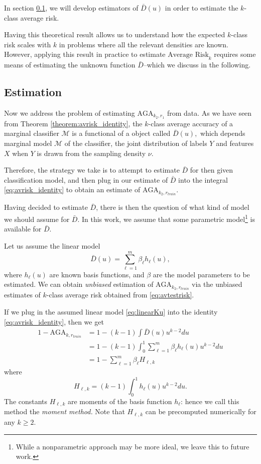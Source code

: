 \documentclass[12pt]{article}
\begin{document}
In section \ref{sec:extrapolation_estimation}, we will develop
estimators of $\bar{D}(u)$ in order to estimate the $k$-class average
risk.

Having this theoretical result allows us to understand how the
expected $k$-class risk scales with $k$ in problems where all the
relevant densities are known.  However, applying this result in
practice to estimate $\text{Average Risk}_k$ requires some means of
estimating the unknown function $\bar{D}$--which we discuss in the
following.

\subsection{Estimation}\label{sec:extrapolation_estimation}

Now we address the problem of estimating $\text{AGA}_{k_2, r_1}$ from
data.  As we have seen from Theorem \ref{theorem:avrisk_identity}, the
$k$-class average accuracy of a marginal classifier $\mathcal{M}$ is a
functional of a object called $\bar{D}(u),$ which depends marginal
model $\mathcal{M}$ of the classifier, the joint distribution of
labels $Y$ and features $X$ when $Y$ is drawn from the sampling
density $\nu$.

Therefore, the strategy we take is to attempt to estimate $\bar{D}$
for then given classification model, and then plug in our estimate of
$\bar{D}$ into the integral \eqref{eq:avrisk_identity} to obtain an
estimate of $\text{AGA}_{k_2, r_{train}}$.

Having decided to estimate $\bar{D}$, there is then the question of
what kind of model we should assume for $\bar{D}$.  In this work, we
assume that some parametric model\footnote{While a
nonparametric approach may be more ideal, we leave this to future work.} is available for $\bar{D}$.

Let us assume the linear model
\begin{equation}\label{eq:linearKu}
\bar{D}(u) = \sum_{\ell = 1}^m \beta_\ell h_\ell(u),
\end{equation}
where $h_\ell(u)$ are known basis functions, and $\beta$ are the model
parameters to be estimated. We can obtain \emph{unbiased} estimation
of $\text{AGA}_{k_2, r_{train}}$ via the unbiased estimates of
$k$-class average risk obtained from \eqref{eq:avtestrisk}.

If we plug in the assumed linear model \eqref{eq:linearKu} into the
identity \eqref{eq:avrisk_identity}, then we get
\begin{align}
1 - \text{AGA}_{k, r_{train}} &= 1 - (k-1)\int \bar{D}(u) u^{k-2} du
\\&= 1 - (k-1)\int_0^1 \sum_{\ell = 1}^m \beta_\ell h_\ell(u) u^{k-2} du
\\&= 1 - \sum_{\ell = 1}^m \beta_\ell H_{\ell,k} \label{eq:avrisk_linear}
\end{align}
where
\begin{equation}
H_{\ell,k} = (k-1) \int_0^1 h_\ell(u) u^{k-2} du.
\end{equation}
The constants $H_{\ell, k}$ are moments of the basis function
$h_\ell$: hence we call this method the \emph{moment method.}  Note
that $H_{\ell, k}$ can be precomputed numerically for any $k \geq 2$.
\end{document}

